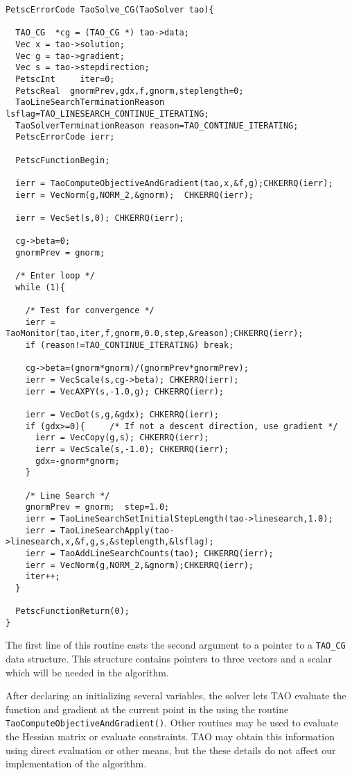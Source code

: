 \begin{verbatim}
PetscErrorCode TaoSolve_CG(TaoSolver tao){

  TAO_CG  *cg = (TAO_CG *) tao->data;
  Vec x = tao->solution;
  Vec g = tao->gradient;
  Vec s = tao->stepdirection;
  PetscInt     iter=0;
  PetscReal  gnormPrev,gdx,f,gnorm,steplength=0;
  TaoLineSearchTerminationReason lsflag=TAO_LINESEARCH_CONTINUE_ITERATING;
  TaoSolverTerminationReason reason=TAO_CONTINUE_ITERATING;
  PetscErrorCode ierr;

  PetscFunctionBegin;

  ierr = TaoComputeObjectiveAndGradient(tao,x,&f,g);CHKERRQ(ierr);
  ierr = VecNorm(g,NORM_2,&gnorm);  CHKERRQ(ierr);

  ierr = VecSet(s,0); CHKERRQ(ierr); 

  cg->beta=0;
  gnormPrev = gnorm;

  /* Enter loop */
  while (1){

    /* Test for convergence */
    ierr = TaoMonitor(tao,iter,f,gnorm,0.0,step,&reason);CHKERRQ(ierr);
    if (reason!=TAO_CONTINUE_ITERATING) break;

    cg->beta=(gnorm*gnorm)/(gnormPrev*gnormPrev);
    ierr = VecScale(s,cg->beta); CHKERRQ(ierr);
    ierr = VecAXPY(s,-1.0,g); CHKERRQ(ierr);
    
    ierr = VecDot(s,g,&gdx); CHKERRQ(ierr);
    if (gdx>=0){     /* If not a descent direction, use gradient */
      ierr = VecCopy(g,s); CHKERRQ(ierr);
      ierr = VecScale(s,-1.0); CHKERRQ(ierr);
      gdx=-gnorm*gnorm;
    } 

    /* Line Search */
    gnormPrev = gnorm;  step=1.0;
    ierr = TaoLineSearchSetInitialStepLength(tao->linesearch,1.0);
    ierr = TaoLineSearchApply(tao->linesearch,x,&f,g,s,&steplength,&lsflag);
    ierr = TaoAddLineSearchCounts(tao); CHKERRQ(ierr);
    ierr = VecNorm(g,NORM_2,&gnorm);CHKERRQ(ierr);
    iter++;
  }
  
  PetscFunctionReturn(0);
}
\end{verbatim}

The first line of this routine casts the second argument to a pointer
to a {\tt TAO\_CG} data structure.  This structure contains pointers
to three vectors and a scalar which will be needed in the algorithm.

After declaring an initializing several variables, the solver lets TAO 
evaluate the function and gradient at the
current point in the using the routine 
{\tt Tao\-Compute\-Objective\-And\-Gradient()}.
Other routines may be used to evaluate the Hessian matrix or evaluate
constraints.  TAO may obtain this information using direct evaluation 
or other means, but the these details do not affect our implementation
of the algorithm.

